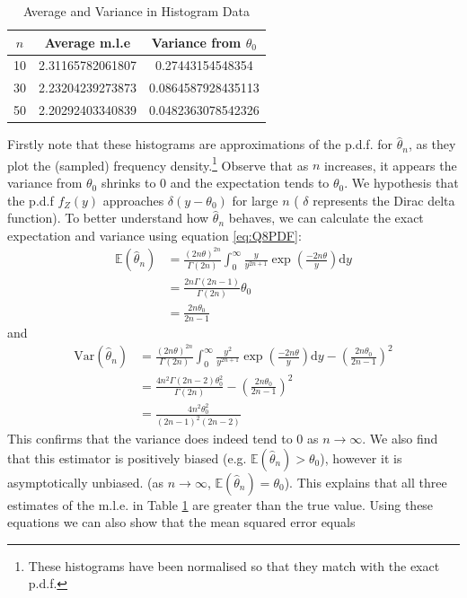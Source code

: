\documentclass[10pt,a4paper,notitlepage]{article}
\newcommand{\Var}[1]{\mathrm{Var}\left(#1\right)}
\newcommand{\E}[1]{\mathbb{E}\left(#1\right)}
\begin{document}
\begin{table}[H]
\centering
\begin{tabular}{|c|c|c|}
\hline $n$ & Average m.l.e & Variance from $\theta_{0}$ \\ \hline 10 & 2.31165782061807 & 0.27443154548354\\ 30 & 2.23204239273873 & 0.0864587928435113 \\ 50 & 2.20292403340839 & 0.0482363078542326\\ \hline 
\end{tabular}
\caption{Average and Variance in Histogram Data}
\label{tb:Q8}
\end{table}
Firstly note that these histograms are approximations of the p.d.f. for $\widehat{\theta}_{n}$, as they plot the (sampled) frequency density.\footnote{These histograms have been normalised so that they match with the exact p.d.f.} Observe that as $n$ increases, it appears the variance from $\theta_{0}$ shrinks to 0 and the expectation tends to $\theta_{0}$. We hypothesis that
the p.d.f $f_{Z}(y)$ approaches $\delta(y-\theta_{0})$ for large $n$ ( $\delta$ represents the Dirac delta function). To better understand how $\widehat{\theta}_{n}$ behaves, we can calculate the exact expectation and variance using equation \eqref{eq:Q8PDF}:
\begin{equation}
\begin{aligned}
\E{\widehat{\theta}_{n}} &=\frac{\left(2n\theta\right)^{2n}}{\Gamma\left(2n\right)}\int_{0}^{\infty}\frac{y}{y^{2n+1}}\exp\left(\frac{-2n\theta}{y}\right)\mathrm{d}y\\
&= \frac{2n\Gamma\left(2n-1\right)}{\Gamma\left(2n\right)}\theta_{0}\\
&=\frac{2n\theta_{0}}{2n-1}
\end{aligned}
\end{equation}
and
\begin{equation}
\begin{aligned}
\Var{\widehat{\theta}_{n}} &=\frac{\left(2n\theta\right)^{2n}}{\Gamma\left(2n\right)}\int_{0}^{\infty}\frac{y^{2}}{y^{2n+1}}\exp\left(\frac{-2n\theta}{y}\right)\mathrm{d}y-\left(\frac{2n\theta_{0}}{2n-1}\right)^{2}\\
&= \frac{4n^{2}\Gamma\left(2n-2\right)\theta_{0}^{2}}{\Gamma\left(2n\right)}-\left(\frac{2n\theta_{0}}{2n-1}\right)^{2}\\
&= \frac{4n^{2}\theta_{0}^{2}}{\left(2n-1\right)^{2}\left(2n-2\right)}
\end{aligned}
\end{equation}
This confirms that the variance does indeed tend to $0$ as $n\rightarrow\infty$. We also find that this estimator is positively biased (e.g. $\mathbb{E}(\widehat{\theta}_{n})> \theta_{0}$), however it is asymptotically unbiased. (as $n\rightarrow \infty$, $\mathbb{E}(\widehat{\theta}_{n})= \theta_{0}$). This explains that all three estimates of the m.l.e. in Table \ref{tb:Q8} are greater than the true value. Using these equations we can also show that the mean squared error equals
\end{document}
